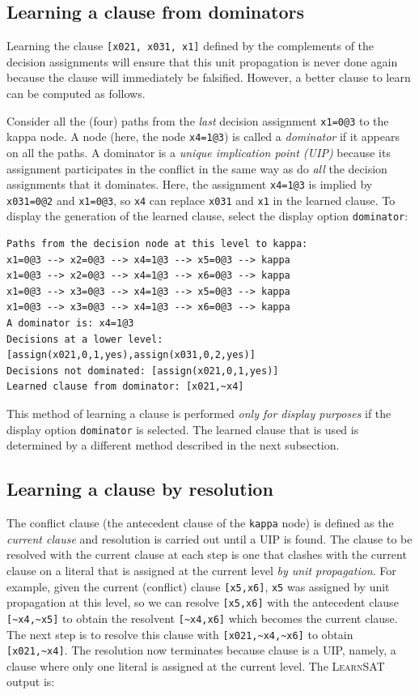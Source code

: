 \documentclass[11pt]{report}
\newcommand*{\p}[1]{\textup{\texttt{#1}}}
\newcommand*{\ls}{\textsc{LearnSAT}}
\begin{document}
\subsection{Learning a clause from dominators}

Learning the clause \p{[x021, x031, x1]} defined by the complements of
the decision assignments will ensure that this unit propagation is never
done again because the clause will immediately be falsified.
However, a better clause to learn can be computed as follows. 

Consider all the (four) paths from the \emph{last} decision assignment
\p{x1=0@3} to the kappa node. A node (here, the node \p{x4=1@3}) is
called a \emph{dominator} if it appears on all the paths. A dominator is
a \emph{unique implication point (UIP)} because its assignment
participates in the conflict in the same way as do \emph{all} the
decision assignments that it dominates. Here, the assignment \p{x4=1@3}
is implied by \p{x031=0@2} and \p{x1=0@3}, so \p{x4} can replace
\p{x031} and \p{x1} in the learned clause. To display the generation of
the learned clause, select the display option \p{dominator}:

\begin{verbatim}
Paths from the decision node at this level to kappa:
x1=0@3 --> x2=0@3 --> x4=1@3 --> x5=0@3 --> kappa
x1=0@3 --> x2=0@3 --> x4=1@3 --> x6=0@3 --> kappa
x1=0@3 --> x3=0@3 --> x4=1@3 --> x5=0@3 --> kappa
x1=0@3 --> x3=0@3 --> x4=1@3 --> x6=0@3 --> kappa
A dominator is: x4=1@3
Decisions at a lower level: [assign(x021,0,1,yes),assign(x031,0,2,yes)]
Decisions not dominated: [assign(x021,0,1,yes)]
Learned clause from dominator: [x021,~x4]
\end{verbatim}

This method of learning a clause is performed \emph{only for display
purposes} if the display option \p{dominator} is selected. The learned
clause that is used is determined by a different method described in the
next subsection.

\subsection{Learning a clause by resolution}

The conflict clause (the antecedent clause of the \p{kappa} node) is
defined as the \emph{current clause} and resolution is carried out until
a UIP is found. The clause to be resolved with the current clause at
each step is one that clashes with the current clause on a literal that
is assigned at the current level \emph{by unit propagation}. For
example, given the current (conflict) clause \p{[x5,x6]}, \p{x5} was
assigned by unit propagation at this level, so we can resolve
\p{[x5,x6]} with the antecedent clause \verb+[~x4,~x5]+ to obtain the
resolvent \verb+[~x4,x6]+ which becomes the current clause. The next
step is to resolve this clause with \verb+[x021,~x4,~x6]+ to obtain
\verb+[x021,~x4]+. The resolution now terminates
because clause is a UIP, namely, a clause where only one literal is
assigned at the current level. The \ls{} output is:
\end{document}
